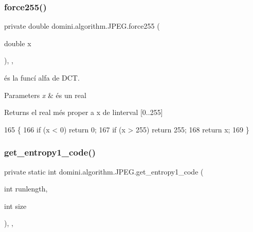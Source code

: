 \subsubsection{\texorpdfstring{force255()}{force255()}}
{\footnotesize\ttfamily private double domini.\+algorithm.\+J\+P\+E\+G.\+force255 (\begin{DoxyParamCaption}\item[{double}]{x }\end{DoxyParamCaption})\hspace{0.3cm}{\ttfamily [inline]}, {\ttfamily [static]}, {\ttfamily [private]}}



és la funcí alfa de D\+CT. 


\begin{DoxyParams}{Parameters}
{\em x} & és un real \\
\hline
\end{DoxyParams}
\begin{DoxyReturn}{Returns}
el real més proper a x de l\textquotesingle{}interval \mbox{[}0..255\mbox{]} 
\end{DoxyReturn}

\begin{DoxyCode}
165                                              \{
166         \textcolor{keywordflow}{if} (x < 0) \textcolor{keywordflow}{return} 0;
167         \textcolor{keywordflow}{if} (x > 255) \textcolor{keywordflow}{return} 255;
168         \textcolor{keywordflow}{return} x;
169     \}
\end{DoxyCode}
\mbox{\label{classdomini_1_1algorithm_1_1JPEG_a0f897c6c525d81551539df1eb8db7e12}} 
\subsubsection{\texorpdfstring{get\+\_\+entropy1\+\_\+code()}{get\_entropy1\_code()}}
{\footnotesize\ttfamily private static int domini.\+algorithm.\+J\+P\+E\+G.\+get\+\_\+entropy1\+\_\+code (\begin{DoxyParamCaption}\item[{int}]{runlength,  }\item[{int}]{size }\end{DoxyParamCaption})\hspace{0.3cm}{\ttfamily [inline]}, {\ttfamily [static]}, {\ttfamily [private]}}



